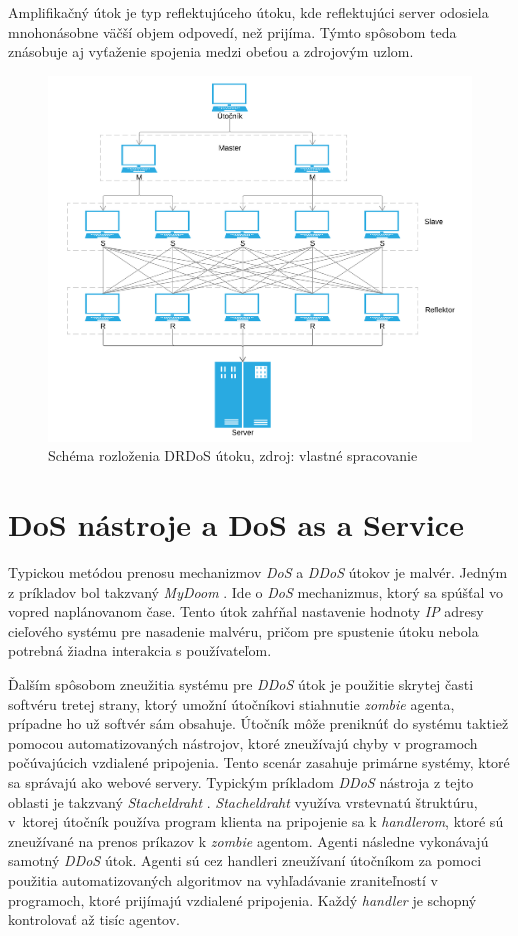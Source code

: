 \documentclass[
  printed, %
  table,   %
  lof,     %
  nolot,   %
  nocover
]{fithesis3}
\begin{document}
Amplifikačný útok je typ reflektujúceho útoku, kde reflektujúci server odosiela mnohonásobne väčší 
objem odpovedí, než prijíma. Týmto spôsobom teda znásobuje aj vyťaženie spojenia medzi obeťou a 
zdrojovým uzlom\cite{Paxson:2001:DoSR}.

\begin{figure}[h]
  \centering
    \includegraphics[width=\textwidth]{images/drdos.png}
  \caption{Schéma rozloženia DRDoS útoku, zdroj: vlastné spracovanie}
  \label{fig:drdos}
\end{figure}

\section{DoS nástroje a DoS as a Service}
Typickou metódou prenosu mechanizmov \textit{DoS} a \textit{DDoS} útokov je malvér. Jedným z príkladov 
bol
takzvaný \textit{MyDoom} \cite{BBC:2004:DoST}. Ide o \textit{DoS} mechanizmus, ktorý sa spúšťal vo vopred naplánovanom čase.
Tento útok zahŕňal nastavenie hodnoty \textit{IP} adresy cieľového systému pre nasadenie malvéru,
pričom pre spustenie útoku nebola potrebná žiadna interakcia s používateľom.

Ďalším spôsobom zneužitia systému pre \textit{DDoS} útok je použitie skrytej časti softvéru tretej
strany, ktorý umožní útočníkovi stiahnutie \textit{zombie} agenta, prípadne ho už softvér sám obsahuje.
Útočník môže preniknúť do systému taktiež pomocou automatizovaných nástrojov, ktoré zneužívajú chyby v
programoch počúvajúcich vzdialené pripojenia. Tento scenár zasahuje primárne systémy, ktoré sa správajú
ako webové servery. Typickým príkladom \textit{DDoS} nástroja z tejto oblasti je takzvaný
\textit{Stacheldraht} \cite{Dittrich:DoST}. \textit{Stacheldraht} využíva vrstevnatú štruktúru, v~ktorej útočník používa
program klienta na pripojenie sa k \textit{handlerom}, ktoré sú zneužívané na prenos príkazov
k \textit{zombie} agentom. Agenti následne vykonávajú samotný \textit{DDoS} útok. Agenti sú cez 
handleri
zneužívaní útočníkom za pomoci použitia automatizovaných algoritmov na vyhľadávanie zraniteľností v
programoch, ktoré prijímajú vzdialené pripojenia. Každý \textit{handler} je schopný kontrolovať až 
tisíc
agentov. 
\end{document}
